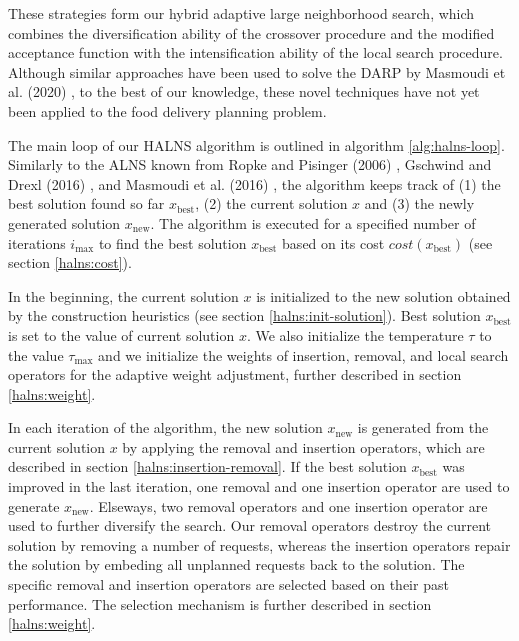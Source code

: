     These strategies form our hybrid adaptive large neighborhood search, which combines the diversification ability of the crossover procedure and the modified acceptance function with the intensification ability of the local search procedure. Although similar approaches have been used to solve the DARP by Masmoudi et al. (2020) \cite{Masmoudi2020}, to the best of our knowledge, these novel techniques have not yet been applied to the food delivery planning problem.
    
    The main loop of our HALNS algorithm is outlined in algorithm \ref{alg:halns-loop}. Similarly to the ALNS known from Ropke and Pisinger (2006) \cite{Ropke2006}, Gschwind and Drexl (2016) \cite{Gschwind2016}, and Masmoudi et al. (2016) \cite{Masmoudi2016}, the algorithm keeps track of (1) the best solution found so far $x_{\mathrm{best}}$, (2) the current solution $x$ and (3) the newly generated solution $x_{\mathrm{new}}$. The algorithm is executed for a specified number of iterations $i_{\mathrm{max}}$ to find the best solution $x_{\mathrm{best}}$ based on its cost $cost(x_{\mathrm{best}})$ (see section \ref{halns:cost}). 
    
    In the beginning, the current solution $x$ is initialized to the new solution obtained by the construction heuristics (see section \ref{halns:init-solution}). Best solution $x_{\mathrm{best}}$ is set to the value of current solution $x$. We also initialize the temperature $\tau$ to the value $\tau_{\mathrm{max}}$ and we initialize the weights of insertion, removal, and local search operators for the adaptive weight adjustment, further described in section \ref{halns:weight}.
    
    In each iteration of the algorithm, the new solution $x_{\mathrm{new}}$ is generated from the current solution $x$ by applying the removal and insertion operators, which are described in section \ref{halns:insertion-removal}. If the best solution $x_{\mathrm{best}}$ was improved in the last iteration, one removal and one insertion operator are used to generate $x_{\mathrm{new}}$. Elseways, two removal operators and one insertion operator are used to further diversify the search. Our removal operators destroy the current solution by removing a number of requests, whereas the insertion operators repair the solution by embeding all unplanned requests back to the solution. The specific removal and insertion operators are selected based on their past performance. The selection mechanism is further described in section \ref{halns:weight}. 
    

